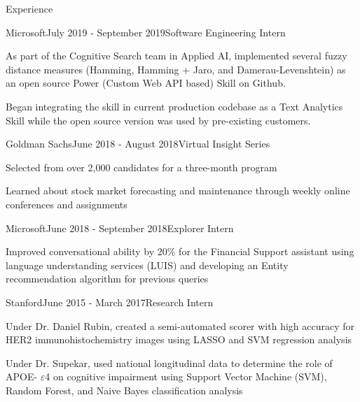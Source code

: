 \documentclass{resume} %
\begin{document}
\begin{rSection}{Experience}

\begin{rSubsection}{Microsoft}{July 2019 - September 2019}{Software Engineering Intern}{}
\item As part of the Cognitive Search team in Applied AI, implemented several fuzzy distance measures (Hamming, Hamming + Jaro, and Damerau-Levenshtein) as an open source Power (Custom Web API based) Skill on Github.
\item Began integrating the skill in current production codebase as a Text Analytics Skill while the open source version was used by pre-existing customers.
\end{rSubsection}


\begin{rSubsection}{Goldman Sachs}{June 2018 - August 2018}{Virtual Insight Series}{}
\item Selected from over 2,000 candidates for a three-month program
\item Learned about stock market forecasting and maintenance through weekly online conferences and assignments
\end{rSubsection}



\begin{rSubsection}{Microsoft}{June 2018 - September 2018}{Explorer Intern}{}
\item Improved conversational ability by 20$\%$ for the Financial Support assistant using language understanding services (LUIS) and developing an Entity recommendation algorithm for previous queries
\end{rSubsection}


\begin{rSubsection}{Stanford}{June 2015 - March 2017}{Research Intern}{}
\item Under Dr. Daniel Rubin, created a semi-automated scorer with high accuracy for HER2 immunohistochemistry images using LASSO and SVM regression analysis
\item Under Dr. Supekar, used national longitudinal data to determine the role of APOE- $\varepsilon$4 on cognitive impairment using Support Vector Machine (SVM), Random Forest, and Naive Bayes classification analysis
\end{rSubsection}


\end{rSection}
\end{document}
